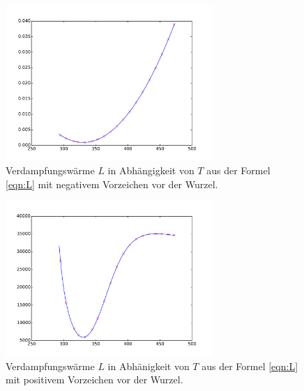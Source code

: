 \begin{figure}
  \centering
  \includegraphics[width=0.7\textwidth]{plot3.pdf}
  \caption{Verdampfungswärme $L$ in Abhängigkeit von $T$ aus der Formel \eqref{eqn:L} mit negativem Vorzeichen vor der Wurzel.}
  \label{abb:g-}
\end{figure}

\begin{figure}
  \centering
  \includegraphics[width=0.7\textwidth]{plot4.pdf}
  \caption{Verdampfungswärme $L$ in Abhänigkeit von $T$ aus der Formel \eqref{eqn:L} mit positivem Vorzeichen vor der Wurzel.}
  \label{abb:+}
\end{figure}
